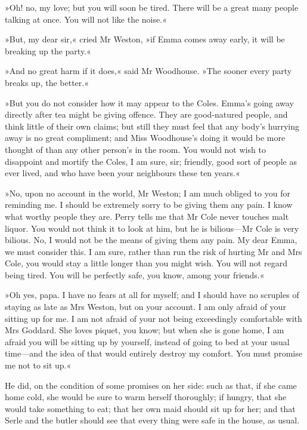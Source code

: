»Oh! no, my love; but you will soon be tired. There will be a great many people talking at once. You will not like the noise.«

»But, my dear sir,« cried Mr Weston, »if Emma comes away early, it will be breaking up the party.«

»And no great harm if it does,« said Mr Woodhouse. »The sooner every party breaks up, the better.«

»But you do not consider how it may appear to the Coles. Emma's going away directly after tea might be giving offence. They are good-natured people, and think little of their own claims; but still they must feel that any body's hurrying away is no great compliment; and Miss Woodhouse's doing it would be more thought of than any other person's in the room. You would not wish to disappoint and mortify the Coles, I am sure, sir; friendly, good sort of people as ever lived, and who have been your neighbours these ten years.«

»No, upon no account in the world, Mr Weston; I am much obliged to you for reminding me. I should be extremely sorry to be giving them any pain. I know what worthy people they are. Perry tells me that Mr Cole never touches malt liquor. You would not think it to look at him, but he is bilious—Mr Cole is very bilious. No, I would not be the means of giving them any pain. My dear Emma, we must consider this. I am sure, rather than run the risk of hurting Mr and Mrs Cole, you would stay a little longer than you might wish. You will not regard being tired. You will be perfectly safe, you know, among your friends.«

»Oh yes, papa. I have no fears at all for myself; and I should have no scruples of staying as late as Mrs Weston, but on your account. I am only afraid of your sitting up for me. I am not afraid of your not being exceedingly comfortable with Mrs Goddard. She loves piquet, you know; but when she is gone home, I am afraid you will be sitting up by yourself, instead of going to bed at your usual time—and the idea of that would entirely destroy my comfort. You must promise me not to sit up.«

He did, on the condition of some promises on her side: such as that, if she came home cold, she would be sure to warm herself thoroughly; if hungry, that she would take something to eat; that her own maid should sit up for her; and that Serle and the butler should see that every thing were safe in the house, as usual.